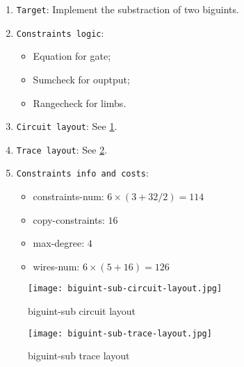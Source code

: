 
\begin{enumerate}
    \item \verb|Target|: Implement the substraction of two biguints.
    \item \verb|Constraints logic|:
    \begin{itemize}
        \item Equation for gate;
        \item Sumcheck for ouptput;
        \item Rangecheck for limbs.
    \end{itemize}
    \item \verb|Circuit layout|: See \ref{fig:biguint-sub-circuit-layout}.
    \item \verb|Trace layout|: See \ref{fig:biguint-sub-trace-layout}.
    \item \verb|Constraints info and costs|:
    \begin{itemize}
        \item constraints-num: $6 \times (3 + 32 / 2) = 114$
        \item copy-constraints: $16$
        \item max-degree: $4$
        \item wires-num: $6 \times (5 + 16) = 126$
    \end{itemize}
\end{enumerate}

\begin{figure}[!ht]
    \centering
    \texttt{[image: biguint-sub-circuit-layout.jpg]}
    \caption{biguint-sub circuit layout}
    \label{fig:biguint-sub-circuit-layout}
\end{figure}

\begin{figure}[!ht]
    \centering
    \texttt{[image: biguint-sub-trace-layout.jpg]}
    \caption{biguint-sub trace layout}
    \label{fig:biguint-sub-trace-layout}
\end{figure}